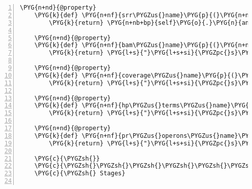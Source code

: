\begin{Verbatim}[commandchars=\\\{\},numbers=left,firstnumber=1,stepnumber=5]
    \PYG{n+nd}{@property}
    \PYG{k}{def} \PYG{n+nf}{srr\PYGZus{}name}\PYG{p}{(}\PYG{n+nb+bp}{self}\PYG{p}{)}\PYG{p}{:}
        \PYG{k}{return} \PYG{n+nb+bp}{self}\PYG{o}{.}\PYG{n}{analysis}\PYG{o}{.}\PYG{n}{inputfile\PYGZus{}base\PYGZus{}name}

    \PYG{n+nd}{@property}
    \PYG{k}{def} \PYG{n+nf}{bam\PYGZus{}name}\PYG{p}{(}\PYG{n+nb+bp}{self}\PYG{p}{)}\PYG{p}{:}
        \PYG{k}{return} \PYG{l+s}{"}\PYG{l+s+si}{\PYGZpc{}s}\PYG{l+s}{ }\PYG{l+s+si}{\PYGZpc{}s}\PYG{l+s}{ Mapping}\PYG{l+s}{"} \PYG{o}{\PYGZpc{}} \PYG{p}{(}\PYG{n+nb+bp}{self}\PYG{o}{.}\PYG{n}{genbank\PYGZus{}record}\PYG{o}{.}\PYG{n}{id}\PYG{p}{,} \PYG{n+nb+bp}{self}\PYG{o}{.}\PYG{n}{srr\PYGZus{}name}\PYG{p}{)}

    \PYG{n+nd}{@property}
    \PYG{k}{def} \PYG{n+nf}{coverage\PYGZus{}name}\PYG{p}{(}\PYG{n+nb+bp}{self}\PYG{p}{)}\PYG{p}{:}
        \PYG{k}{return} \PYG{l+s}{"}\PYG{l+s+si}{\PYGZpc{}s}\PYG{l+s}{ }\PYG{l+s+si}{\PYGZpc{}s}\PYG{l+s}{ Coverage}\PYG{l+s}{"} \PYG{o}{\PYGZpc{}} \PYG{p}{(}\PYG{n+nb+bp}{self}\PYG{o}{.}\PYG{n}{genbank\PYGZus{}record}\PYG{o}{.}\PYG{n}{id}\PYG{p}{,} \PYG{n+nb+bp}{self}\PYG{o}{.}\PYG{n}{srr\PYGZus{}name}\PYG{p}{)}

    \PYG{n+nd}{@property}
    \PYG{k}{def} \PYG{n+nf}{hp\PYGZus{}terms\PYGZus{}name}\PYG{p}{(}\PYG{n+nb+bp}{self}\PYG{p}{)}\PYG{p}{:}
        \PYG{k}{return} \PYG{l+s}{"}\PYG{l+s+si}{\PYGZpc{}s}\PYG{l+s}{ Hairpin Terminators}\PYG{l+s}{"} \PYG{o}{\PYGZpc{}} \PYG{p}{(}\PYG{n+nb+bp}{self}\PYG{o}{.}\PYG{n}{genbank\PYGZus{}record}\PYG{o}{.}\PYG{n}{id}\PYG{p}{,}\PYG{p}{)}

    \PYG{n+nd}{@property}
    \PYG{k}{def} \PYG{n+nf}{pr\PYGZus{}operons\PYGZus{}name}\PYG{p}{(}\PYG{n+nb+bp}{self}\PYG{p}{)}\PYG{p}{:}
        \PYG{k}{return} \PYG{l+s}{"}\PYG{l+s+si}{\PYGZpc{}s}\PYG{l+s}{ Predicted Operons}\PYG{l+s}{"} \PYG{o}{\PYGZpc{}} \PYG{p}{(}\PYG{n+nb+bp}{self}\PYG{o}{.}\PYG{n}{genbank\PYGZus{}record}\PYG{o}{.}\PYG{n}{id}\PYG{p}{,}\PYG{p}{)}

    \PYG{c}{\PYGZsh{}}
    \PYG{c}{\PYGZsh{}\PYGZsh{}\PYGZsh{}\PYGZsh{}\PYGZsh{}\PYGZsh{}\PYGZsh{}\PYGZsh{}\PYGZsh{}\PYGZsh{}\PYGZsh{}\PYGZsh{}\PYGZsh{}\PYGZsh{}\PYGZsh{}\PYGZsh{}\PYGZsh{}\PYGZsh{}\PYGZsh{}\PYGZsh{}\PYGZsh{}\PYGZsh{}\PYGZsh{}\PYGZsh{}\PYGZsh{}\PYGZsh{}\PYGZsh{}\PYGZsh{}\PYGZsh{}\PYGZsh{}\PYGZsh{}\PYGZsh{}\PYGZsh{}\PYGZsh{}\PYGZsh{}\PYGZsh{}\PYGZsh{}\PYGZsh{}\PYGZsh{}\PYGZsh{}\PYGZsh{}\PYGZsh{}\PYGZsh{}\PYGZsh{}\PYGZsh{}\PYGZsh{}\PYGZsh{}\PYGZsh{}\PYGZsh{}\PYGZsh{}\PYGZsh{}\PYGZsh{}\PYGZsh{}\PYGZsh{}\PYGZsh{}\PYGZsh{}\PYGZsh{}\PYGZsh{}\PYGZsh{}\PYGZsh{}\PYGZsh{}\PYGZsh{}\PYGZsh{}\PYGZsh{}\PYGZsh{}\PYGZsh{}\PYGZsh{}\PYGZsh{}\PYGZsh{}\PYGZsh{}\PYGZsh{}\PYGZsh{}\PYGZsh{}\PYGZsh{}\PYGZsh{}\PYGZsh{}}
    \PYG{c}{\PYGZsh{} Stages}


\end{Verbatim}
